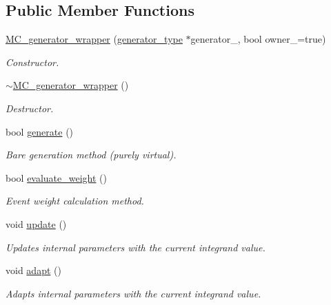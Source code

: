 \subsection*{Public Member Functions}
\begin{DoxyCompactItemize}
\item 
\hypertarget{a00367_abebdfe6804af3a7b4e9360632ebb13f4}{}\hyperlink{a00367_abebdfe6804af3a7b4e9360632ebb13f4}{M\+C\+\_\+generator\+\_\+wrapper} (\hyperlink{a00366}{generator\+\_\+type} $\ast$generator\+\_\+, bool owner\+\_\+=true)\label{a00367_abebdfe6804af3a7b4e9360632ebb13f4}

\begin{DoxyCompactList}\small\item\em Constructor. \end{DoxyCompactList}\item 
\hypertarget{a00367_a6cf4eb6458d51e634c6b4ebcb719b0fb}{}\hyperlink{a00367_a6cf4eb6458d51e634c6b4ebcb719b0fb}{$\sim$\+M\+C\+\_\+generator\+\_\+wrapper} ()\label{a00367_a6cf4eb6458d51e634c6b4ebcb719b0fb}

\begin{DoxyCompactList}\small\item\em Destructor. \end{DoxyCompactList}\item 
bool \hyperlink{a00367_a5fa053a552e2022c82efc1d250f38017}{generate} ()
\begin{DoxyCompactList}\small\item\em \textquotesingle{}Bare generation\textquotesingle{} method (purely virtual). \end{DoxyCompactList}\item 
\hypertarget{a00367_aca1d1e4feec55bd7af3ccac697645d64}{}bool \hyperlink{a00367_aca1d1e4feec55bd7af3ccac697645d64}{evaluate\+\_\+weight} ()\label{a00367_aca1d1e4feec55bd7af3ccac697645d64}

\begin{DoxyCompactList}\small\item\em Event weight calculation method. \end{DoxyCompactList}\item 
\hypertarget{a00367_aef97ca76b294a65b54e07159b3bd9d0c}{}void \hyperlink{a00367_aef97ca76b294a65b54e07159b3bd9d0c}{update} ()\label{a00367_aef97ca76b294a65b54e07159b3bd9d0c}

\begin{DoxyCompactList}\small\item\em Updates internal parameters with the current integrand value. \end{DoxyCompactList}\item 
\hypertarget{a00367_a49710db0b359ca453fe42f4ce63b24f1}{}void \hyperlink{a00367_a49710db0b359ca453fe42f4ce63b24f1}{adapt} ()\label{a00367_a49710db0b359ca453fe42f4ce63b24f1}

\begin{DoxyCompactList}\small\item\em Adapts internal parameters with the current integrand value. \end{DoxyCompactList}\end{DoxyCompactItemize}
